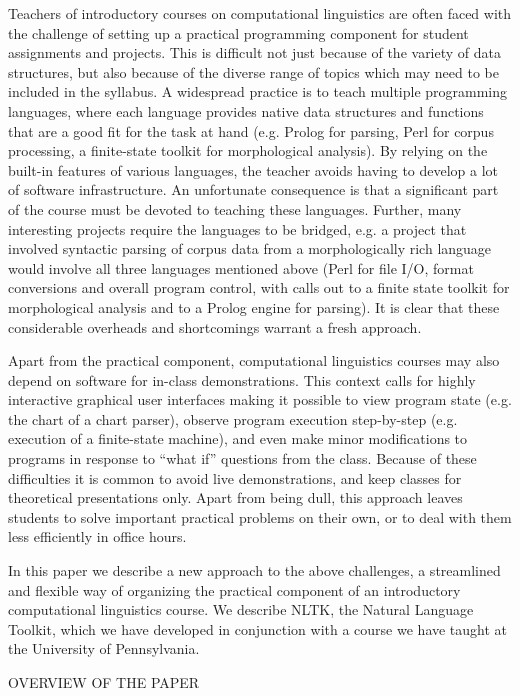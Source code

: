 \documentclass[11pt]{article}
\begin{document}
Teachers of introductory courses on computational linguistics are
often faced with the challenge of setting up a practical programming
component for student assignments and projects.  This is difficult not
just because of the variety of data structures, but also because of
the diverse range of topics which may need to be included in the
syllabus.  A widespread practice is to teach multiple programming
languages, where each language provides native data structures and functions
that are a good fit for the task at hand (e.g. Prolog for parsing,
Perl for corpus processing, a finite-state toolkit for morphological
analysis).  By relying on the built-in features of various languages,
the teacher avoids having to develop a lot of software infrastructure.
An unfortunate consequence is that a significant part of the course
must be devoted to teaching these languages.  Further, many
interesting projects require the languages to be bridged, e.g. a
project that involved syntactic parsing of corpus data from a
morphologically rich language would involve all three languages
mentioned above (Perl for file I/O, format conversions and overall
program control, with calls out to a finite state toolkit for
morphological analysis and to a Prolog engine for parsing).  It is
clear that these considerable overheads and shortcomings warrant a
fresh approach.

Apart from the practical component, computational linguistics courses
may also depend on software for in-class demonstrations.  This context
calls for highly interactive graphical user interfaces making it
possible to view program state (e.g. the chart of a chart parser),
observe program execution step-by-step (e.g. execution of a
finite-state machine), and even make minor modifications to programs
in response to ``what if'' questions from the class.  Because of these
difficulties it is common to avoid live demonstrations, and keep
classes for theoretical presentations only.  Apart from being dull,
this approach leaves students to solve important practical problems on
their own, or to deal with them less efficiently in office hours.

In this paper we describe a new approach to the above challenges,
a streamlined and flexible way of organizing the practical component
of an introductory computational linguistics course.  We describe
NLTK, the Natural Language Toolkit, which we have developed in
conjunction with a course we have taught at the University of Pennsylvania.

OVERVIEW OF THE PAPER
\end{document}
